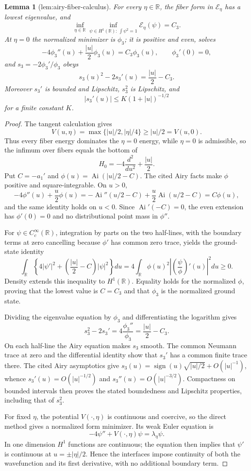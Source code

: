 \documentclass{article}
\newtheorem{lemma}{Lemma}
\begin{document}
\begin{lemma}[lem:airy-fiber-calculus]\label{lem:airy-fiber-calculus}
For every \(\eta\in\mathbb R\), the fiber form in \(\mathcal E_\eta\) has a lowest eigenvalue, and
\[
\inf_{\eta\in\mathbb R}\inf_{\psi\in H^1(\mathbb R):\,\int\psi^2=1}
\mathcal E_\eta(\psi)=C_3.
\]
At \(\eta=0\) the normalized minimizer is \(\phi_3\); it is positive and even, solves
\[
-4\phi_3''(u)+\frac{|u|}{2}\phi_3(u)=C_3\phi_3(u),
\qquad \phi_3'(0)=0,
\]
and \(s_3=-2\phi_3'/\phi_3\) obeys
\[
s_3(u)^2-2s_3'(u)=\frac{|u|}{2}-C_3.
\]
Moreover \(s_3'\) is bounded and Lipschitz, \(s_3^2\) is Lipschitz, and
\[
|s_3'(u)|\leq K(1+|u|)^{-1/2}
\]
for a finite constant \(K\).
\end{lemma}
\begin{proof}
The tangent calculation gives
\[
V(u,\eta)=\max\{|u|/2,|\eta|/4\}\geq |u|/2=V(u,0).
\]
Thus every fiber energy dominates the \(\eta=0\) energy, while \(\eta=0\) is admissible, so the infimum over fibers equals the bottom of
\[
H_0=-4\frac{d^2}{du^2}+\frac{|u|}{2}.
\]
Put \(C=-a_1'\) and \(\phi(u)=\operatorname{Ai}(|u|/2-C)\).  The cited Airy facts make \(\phi\) positive and square-integrable.  On \(u>0\),
\[
-4\phi''(u)+\frac u2\phi(u)
=-\operatorname{Ai}''(u/2-C)+\frac u2\operatorname{Ai}(u/2-C)
=C\phi(u),
\]
and the same identity holds on \(u<0\).  Since \(\operatorname{Ai}'(-C)=0\), the even extension has \(\phi'(0)=0\) and no distributional point mass in \(\phi''\).

For \(\psi\in C_c^\infty(\mathbb R)\), integration by parts on the two half-lines, with the boundary terms at zero cancelling because \(\phi'\) has common zero trace, yields the ground-state identity
\[
\int_{\mathbb R}\left\{4|\psi'|^2+
\left(\frac{|u|}{2}-C\right)|\psi|^2\right\}du
=4\int_{\mathbb R}\phi(u)^2
\left|\left(\frac{\psi}{\phi}\right)'(u)\right|^2du\geq0.
\]
Density extends this inequality to \(H^1(\mathbb R)\).  Equality holds for the normalized \(\phi\), proving that the lowest value is \(C=C_3\) and that \(\phi_3\) is the normalized ground state.

Dividing the eigenvalue equation by \(\phi_3\) and differentiating the logarithm gives
\[
s_3^2-2s_3'=4\frac{\phi_3''}{\phi_3}
=\frac{|u|}{2}-C_3.
\]
On each half-line the Airy equation makes \(s_3\) smooth.  The common Neumann trace at zero and the differential identity show that \(s_3'\) has a common finite trace there.  The cited Airy asymptotics give \(s_3(u)=\operatorname{sign}(u)\sqrt{|u|/2}+O(|u|^{-1})\), whence \(s_3'(u)=O(|u|^{-1/2})\) and \(s_3''(u)=O(|u|^{-3/2})\).  Compactness on bounded intervals then proves the stated boundedness and Lipschitz properties, including that of \(s_3^2\).

For fixed \(\eta\), the potential \(V(\cdot,\eta)\) is continuous and coercive, so the direct method gives a normalized form minimizer.  Its weak Euler equation is
\[
-4\psi''+V(\cdot,\eta)\psi=\lambda_\eta\psi.
\]
In one dimension \(H^1\) functions are continuous; the equation then implies that \(\psi'\) is continuous at \(u=\pm|\eta|/2\).  Hence the interfaces impose continuity of both the wavefunction and its first derivative, with no additional boundary term.
\end{proof}
\end{document}
